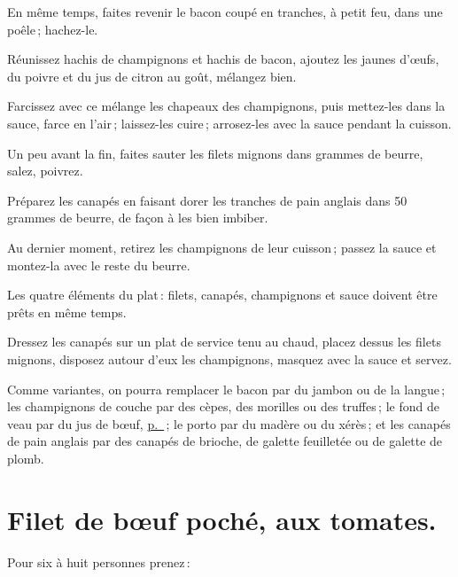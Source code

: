 En même temps, faites revenir le bacon coupé en tranches, à petit feu, dans une
poêle ; hachez-le.

Réunissez hachis de champignons et hachis de bacon, ajoutez les jaunes d'œufs,
du poivre et du jus de citron au goût, mélangez bien.

Farcissez avec ce mélange les chapeaux des champignons, puis mettez-les dans la
sauce, farce en l'air ; laissez-les cuire ; arrosez-les avec la sauce pendant
la cuisson.

Un peu avant la fin, faites sauter les filets mignons dans {\mmm} grammes
de beurre, salez, poivrez.

Préparez les canapés en faisant dorer les tranches de pain anglais dans 50
grammes de beurre, de façon à les bien imbiber.

Au dernier moment, retirez les champignons de leur cuisson ; passez la sauce et
montez-la avec le reste du beurre.

Les quatre éléments du plat : filets, canapés, champignons et sauce doivent
être prêts en même temps.

Dressez les canapés sur un plat de service tenu au chaud, placez dessus les filets
mignons, disposez autour d'eux les champignons, masquez avec la sauce et servez.

\sk

Comme variantes, on pourra remplacer le bacon par du jambon ou de la langue ;
les champignons de couche par des cèpes, des morilles ou des truffes ; le fond
de veau par du jus de bœuf, \hyperlink{p0201}{p. \pageref{pg0201}} ; le porto par
du madère ou du xérès ; et les canapés de pain anglais par des canapés de
brioche, de galette feuilletée ou de galette de plomb.

\section*{\centering Filet de bœuf poché, aux tomates.}
{}

\label{pg0464} \hypertarget{p0464}{}

Pour six à huit personnes prenez :

\medskip

